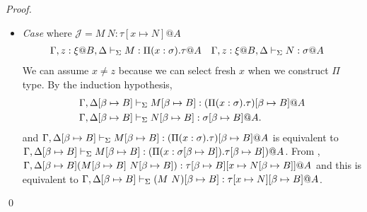 \begin{proof}
\begin{itemize}
		\item[] \textit{Case} \TApp{} where \( \mathcal{J} = M\ N:\tau[x\mapsto N]@A \)
		      \begin{align*}
		      	  & \G, z:\xi@B, \D \V M:\Pi(x:\sigma).\tau@A && \G, z:\xi@B, \D \V N:\sigma@A 
		      \end{align*}
		      We can assume $x \neq z$ because we can select fresh $x$ when we construct $\Pi$ type.
		      By the induction hypothesis,
		      \begin{align*}
		      	  & \G, \D\SB \V M\SB: (\Pi(x:\sigma).\tau)\SB@A \\
		      	  & \G,\D\SB\V N\SB: \sigma\SB@A.                
		      \end{align*}
		      and \(\G, \D\SB \V M\SB: (\Pi(x:\sigma).\tau)\SB@A\) is equivalent to \( \Gamma, \Delta[\beta \mapsto B] \vdash_\Sigma M[\beta \mapsto B]: (\Pi(x:\sigma[\beta \mapsto B]).\tau[\beta \mapsto B])@A \).
		      From \TApp, \(\Gamma,\Delta[\beta \mapsto B] (M[\beta \mapsto B]\ N[\beta \mapsto B]): \tau[\beta \mapsto B][x \mapsto N[\beta \mapsto B]]@A\) and this is equivalent to
		      \(\G,\D\SB \V (M\ N)\SB: \tau[x \mapsto N]\SB@A\).
	\end{itemize}
\qed\end{proof}

				
				
				
	      	      	      	      
	      	      	      	      
	      	      	      	      
	      	      	      	      
	      	      	      	      
	      	      	      	      
	      	      	      	      
	      	      	      	      
